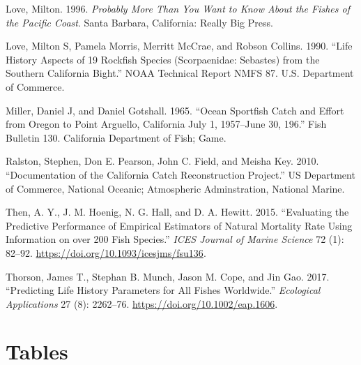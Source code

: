 \documentclass[11pt,
  english,
  a4paper,
]{article}
\begin{document}
\begin{cslreferences}
\leavevmode\hypertarget{ref-love_milton_probably_1996}{}%
Love, Milton. 1996. \emph{Probably More Than You Want to Know About the Fishes of the Pacific Coast}. Santa Barbara, California: Really Big Press.

\leavevmode\hypertarget{ref-love_life_1990}{}%
Love, Milton S, Pamela Morris, Merritt McCrae, and Robson Collins. 1990. ``Life History Aspects of 19 Rockfish Species (Scorpaenidae: Sebastes) from the Southern California Bight.'' NOAA Technical Report NMFS 87. U.S. Department of Commerce.

\leavevmode\hypertarget{ref-miller_ocean_1965}{}%
Miller, Daniel J, and Daniel Gotshall. 1965. ``Ocean Sportfish Catch and Effort from Oregon to Point Arguello, California July 1, 1957--June 30, 196.'' Fish Bulletin 130. California Department of Fish; Game.

\leavevmode\hypertarget{ref-ralston_documentation_2010}{}%
Ralston, Stephen, Don E. Pearson, John C. Field, and Meisha Key. 2010. ``Documentation of the California Catch Reconstruction Project.'' US Department of Commerce, National Oceanic; Atmospheric Adminstration, National Marine.

\leavevmode\hypertarget{ref-then_evaluating_2015-1}{}%
Then, A. Y., J. M. Hoenig, N. G. Hall, and D. A. Hewitt. 2015. ``Evaluating the Predictive Performance of Empirical Estimators of Natural Mortality Rate Using Information on over 200 Fish Species.'' \emph{ICES Journal of Marine Science} 72 (1): 82--92. \url{https://doi.org/10.1093/icesjms/fsu136}.

\leavevmode\hypertarget{ref-thorson_predicting_2017}{}%
Thorson, James T., Stephan B. Munch, Jason M. Cope, and Jin Gao. 2017. ``Predicting Life History Parameters for All Fishes Worldwide.'' \emph{Ecological Applications} 27 (8): 2262--76. \url{https://doi.org/10.1002/eap.1606}.
\end{cslreferences}

\leavevmode\tagmcend\tagstructend

\clearpage


\hypertarget{tables}{%
\section{Tables}\label{tables}}

\leavevmode\tagmcend\tagstructend


\end{document}

